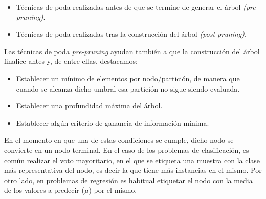 \begin{itemize}
	\item Técnicas de poda realizadas antes de que se termine de generar el árbol \textit{(pre-pruning)}.
	\item Técnicas de poda realizadas tras la construcción del árbol \textit{(post-pruning)}.\\
\end{itemize}

Las técnicas de poda \textit{pre-pruning} ayudan también a que la construcción del árbol finalice antes y, de entre ellas, destacamos:\\

\begin{itemize}
	\item Establecer un mínimo de elementos por nodo/partición, de manera que cuando se alcanza dicho umbral esa partición no sigue siendo evaluada.
	\item Establecer una profundidad máxima del árbol.
	\item Establecer algún criterio de ganancia de información mínima.\\
\end{itemize}

En el momento en que una de estas condiciones se cumple, dicho nodo se convierte en un nodo terminal. En el caso de los problemas de clasificación, es común realizar el voto mayoritario, en el que se etiqueta una muestra con la clase más representativa del nodo, es decir la que tiene más instancias en el mismo. Por otro lado, en problemas de regresión es habitual etiquetar el nodo con la media de los valores a predecir ($\mu$) por el mismo.\\

